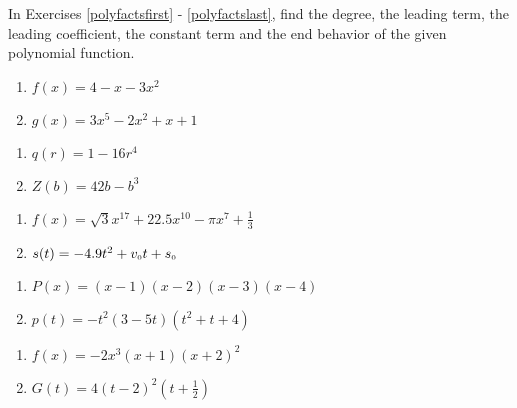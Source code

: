 \documentclass{ximera}
\begin{document}
In Exercises \ref{polyfactsfirst} - \ref{polyfactslast}, find the degree, the leading term, the leading coefficient, the constant term and the end behavior of the given polynomial function.

\begin{multicols}{2}
\begin{enumerate}
\setcounter{enumi}{\value{HW}}
\item  $f(x) = 4-x-3x^2$ \label{polyfactsfirst}
\item  $g(x) = 3x^5 - 2x^2 + x + 1$

\setcounter{HW}{\value{enumi}}
\end{enumerate}
\end{multicols}

\begin{multicols}{2}
\begin{enumerate}
\setcounter{enumi}{\value{HW}}

\item $q(r) = 1 - 16r^{4}$
\item $Z(b) = 42b - b^{3}$

\setcounter{HW}{\value{enumi}}
\end{enumerate}
\end{multicols}

\begin{multicols}{2}
\begin{enumerate}
\setcounter{enumi}{\value{HW}}

\item $f(x) = \sqrt{3}x^{17} + 22.5x^{10} - \pi x^{7} + \frac{1}{3}$
\item $s(t) = -4.9t^{2} + v_{\mbox{\tiny $0$}}t + s_{\mbox{\tiny $0$}}$

\setcounter{HW}{\value{enumi}}
\end{enumerate}
\end{multicols}

\begin{multicols}{2}
\begin{enumerate}
\setcounter{enumi}{\value{HW}}

\item $P(x) = (x - 1)(x - 2)(x - 3)(x - 4)$
\item $p(t) = -t^2(3 - 5t)(t^{2} + t + 4)$

\setcounter{HW}{\value{enumi}}
\end{enumerate}
\end{multicols}

\begin{multicols}{2}
\begin{enumerate}
\setcounter{enumi}{\value{HW}}

\item $f(x) = -2x^3(x+1)(x+2)^2$
\item $G(t) = 4(t-2)^2\left(t+\frac{1}{2}\right)$ \label{polyfactslast}

\setcounter{HW}{\value{enumi}}
\end{enumerate}
\end{multicols}
\end{document}
